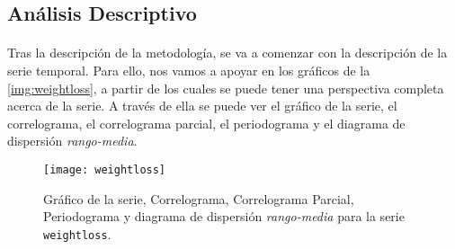 \documentclass[a4paper, spanish]{article}
\begin{document}
    \subsection{Análisis Descriptivo}
    \label{sec:descriptive}


      \paragraph{}
      Tras la descripción de la metodología, se va a comenzar con la descripción de la serie temporal. Para ello, nos vamos a apoyar en los gráficos de la \autoref{img:weightloss}, a partir de los cuales se puede tener una perspectiva completa acerca de la serie. A través de ella se puede ver el gráfico de la serie, el correlograma, el correlograma parcial, el periodograma y el diagrama de dispersión \emph{rango-media}.

      \begin{figure}[htb!]
        \centering
        \texttt{[image: weightloss]}
        \caption{Gráfico de la serie, Correlograma, Correlograma Parcial, Periodograma y diagrama de dispersión \emph{rango-media} para la serie \texttt{weightloss}.}
        \label{img:weightloss}
      \end{figure}
\end{document}
